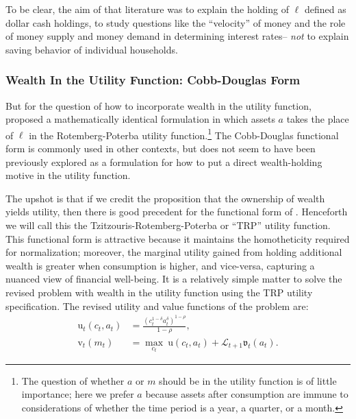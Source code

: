 \documentclass{article}
\newcommand{\CRRA}{\rho}
\newcommand{\uFunc}{\mathrm{u}}
\newcommand{\vFunc}{\mathrm{v}}
\newcommand{\Alive}{\mathcal{L}}
\newcommand{\cNrm}{c}
\newcommand{\mNrm}{m}
\newcommand{\aNrm}{a}
\newcommand{\lqdt}{\ell}
\begin{document}
To be clear, the aim of that literature was to explain the holding of $\lqdt$ defined as dollar cash holdings, to study questions like the ``velocity'' of money and the role of money supply and money demand in determining interest rates-- \textit{not} to explain saving behavior of individual households.

\subsubsection{Wealth In the Utility Function: Cobb-Douglas Form}

But for the question of how to incorporate wealth in the utility function, \cite{Tzitzouris2024} proposed a mathematically identical formulation in which assets $\aNrm$ takes the place of $\lqdt$ in the Rotemberg-Poterba utility function.\footnote{The question of whether $\aNrm$ or $\mNrm$ should be in the utility function is of little importance; here we prefer $\aNrm$ because assets after consumption are immune to considerations of whether the time period is a year, a quarter, or a month.}
The Cobb-Douglas functional form is commonly used in other contexts, but does not seem to have been previously explored as a formulation for how to put a direct wealth-holding motive in the utility function.


The upshot is that if we credit the proposition that the ownership of wealth yields utility, then there is good precedent for the functional form of \cite{Tzitzouris2024}.
Henceforth we will call this the Tzitzouris-Rotemberg-Poterba or ``TRP'' utility function. This functional form is attractive because it maintains the homotheticity required for normalization; moreover, the marginal utility gained from holding additional wealth is greater when consumption is higher, and vice-versa, capturing a nuanced view of financial well-being.
It is a relatively simple matter to solve the revised problem with wealth in the utility function using the TRP utility specification. The revised utility and value functions of the problem are:
\begin{align}
    \uFunc_t(\cNrm_t, \aNrm_t) & = \frac{\left(\cNrm_t^{1-\delta}\aNrm_t^{\delta}\right)^{1-\CRRA}}{1-\CRRA}, \\
    {\vFunc}_{t}({\mNrm}_{t}) & = \max_{\cNrm_{t}} ~ \uFunc(\cNrm_{t}, \aNrm_{t})+\Alive_{t+1}\mathfrak{v}_{t}(a_{t}).
\end{align}
\end{document}
